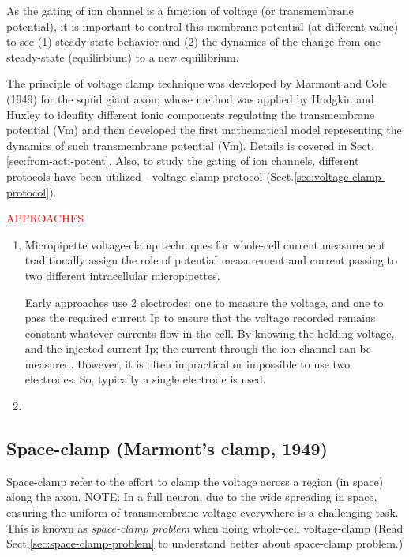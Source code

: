 As the gating of ion channel is a function of voltage (or transmembrane
potential), it is important to control this membrane potential (at different
value) to see (1) steady-state behavior and (2) the dynamics of the change from
one steady-state (equilirbium) to a new equilibrium.

The principle of voltage clamp technique was developed by Marmont and Cole
(1949) for the squid giant axon; whose method was applied by Hodgkin and Huxley
to idenfity different ionic components regulating the transmembrane potential
(Vm) and then developed the first mathematical model representing the dynamics
of such transmembrane potential (Vm). Details is covered in
Sect.\ref{sec:from-acti-potent}. Also, to study the gating of ion channels,
different protocols have been utilized - voltage-clamp protocol
(Sect.\ref{sec:voltage-clamp-protocol}).

\textcolor{red}{APPROACHES}
\begin{enumerate}
  \item  Micropipette voltage-clamp techniques for whole-cell current measurement traditionally
assign the role of potential measurement and current passing to two different intracellular
micropipettes.

Early approaches use 2 electrodes: one to measure the voltage, and one to pass
the required current Ip  to ensure that the voltage recorded remains constant
whatever currents flow in the cell. By knowing the holding voltage, and the
injected current Ip; the current through the ion channel can be measured.
However, it is often impractical or impossible to use two electrodes.
So, typically a single electrode is used.

  \item 
\end{enumerate}





\subsection{Space-clamp (Marmont's clamp, 1949)}
\label{sec:space-clamp}
\label{sec:Marmont-clamp-device}

Space-clamp refer to the effort to clamp the voltage across a region (in space)
along the axon. NOTE: In a full neuron, due to the wide spreading in space,
ensuring the uniform of transmembrane voltage everywhere is a challenging
task. This is known as {\it space-clamp problem} when doing whole-cell
voltage-clamp (Read Sect.\ref{sec:space-clamp-problem} to understand better
about space-clamp problem.)

